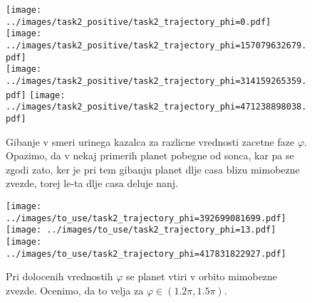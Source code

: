 \documentclass[11pt, a4paper]{article}
\begin{document}
    \begin{figure}[H]
        \centering
        \texttt{[image: ../images/task2\_positive/task2\_trajectory\_phi=0.pdf]}
        \texttt{[image: ../images/task2\_positive/task2\_trajectory\_phi=157079632679.pdf]}\\
        \texttt{[image: ../images/task2\_positive/task2\_trajectory\_phi=314159265359.pdf]}
        \texttt{[image: ../images/task2\_positive/task2\_trajectory\_phi=471238898038.pdf]}
        \caption{Gibanje v smeri urinega kazalca za razlicne vrednosti zacetne faze $\varphi$. Opazimo, da v nekaj primerih planet pobegne od sonca, kar pa se zgodi zato,
        ker je pri tem gibanju planet dlje casa blizu mimobezne zvezde, torej le-ta dlje casa deluje nanj.}
        \label{fig:task2_positive}
    \end{figure}

    \begin{figure}[H]
        \centering
        \texttt{[image: ../images/to\_use/task2\_trajectory\_phi=392699081699.pdf]}\\
        \texttt{[image: ../images/to\_use/task2\_trajectory\_phi=13.pdf]}\\
        \texttt{[image: ../images/to\_use/task2\_trajectory\_phi=417831822927.pdf]}
        \caption{Pri dolocenih vrednostih $\varphi$ se planet vtiri v orbito mimobezne zvezde. Ocenimo, da to velja za $\varphi \in (1.2\pi, 1.5\pi)$.}
        \label{fig:task2_follows}
    \end{figure}
\end{document}
